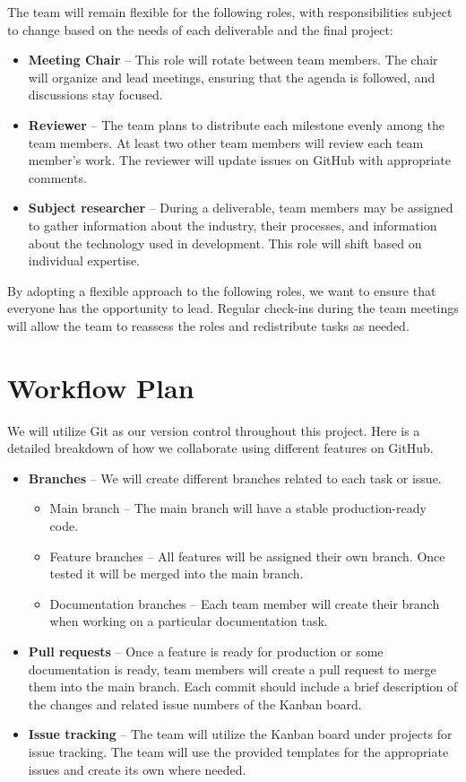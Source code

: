 \documentclass{article}
\begin{document}
The team will remain flexible for the following roles, with responsibilities subject to change based on the needs of each deliverable and the final project:
\begin{itemize}
\item \textbf{Meeting Chair} -- This role will rotate between team members. The chair will organize and lead meetings, ensuring that the agenda is followed, and discussions stay focused.
\item \textbf{Reviewer} -- The team plans to distribute each milestone evenly among the team members. At least two other team members will review each team member’s work. The reviewer will update issues on GitHub with appropriate comments.
\item \textbf{Subject researcher} -- During a deliverable, team members may be assigned to gather information about the industry, their processes, and information about the technology used in development. This role will shift based on individual expertise.
\end{itemize}
By adopting a flexible approach to the following roles, we want to ensure that everyone has the opportunity to lead. Regular check-ins during the team meetings will allow the team to reassess the roles and redistribute tasks as needed. 


\section{Workflow Plan}

We will utilize Git as our version control throughout this project. Here is a detailed breakdown of how we collaborate using different features on GitHub. 

\begin{itemize}
\item \textbf{Branches} -- We will create different branches related to each task or issue. 
\begin{itemize}
\item Main branch -- The main branch will have a stable production-ready code. 
\item Feature branches -- All features will be assigned their own branch. Once tested it will be merged into the main branch.
\item Documentation branches -- Each team member will create their branch when working on a particular documentation task. 
\end{itemize}

\item \textbf{Pull requests} -- Once a feature is ready for production or some documentation is ready, team members will create a pull request to merge them into the main branch. Each commit should include a brief description of the changes and related issue numbers of the Kanban board.

\item \textbf{Issue tracking} -- The team will utilize the Kanban board under projects for issue tracking. The team will use the provided templates for the appropriate issues and create its own where needed. 
\end{itemize}
\end{document}
